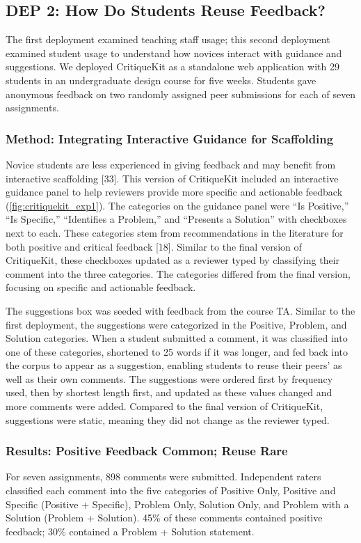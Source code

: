 \subsection{DEP 2: How Do Students Reuse Feedback?}
The first deployment examined teaching staff usage; this second deployment examined student usage to understand how novices interact with guidance and suggestions. We deployed CritiqueKit as a standalone web application with 29 students in an undergraduate design course for five weeks. Students gave anonymous feedback on two randomly assigned peer submissions for each of seven assignments.

\subsubsection{Method: Integrating Interactive Guidance for Scaffolding}
Novice students are less experienced in giving feedback and may benefit from interactive scaffolding [33]. This version of CritiqueKit included an interactive guidance panel to help reviewers provide more specific and actionable feedback (\autoref{fig:critiquekit_exp1}). The categories on the guidance panel were ``Is Positive,'' ``Is Specific,'' ``Identifies a Problem,'' and ``Presents a Solution'' with checkboxes next to each. These categories stem from recommendations in the literature for both positive and critical feedback [18]. Similar to the final version of CritiqueKit, these checkboxes updated as a reviewer typed by classifying their comment into the three categories. The categories differed from the final version, focusing on specific and actionable feedback. 

The suggestions box was seeded with feedback from the course TA. Similar to the first deployment, the suggestions were categorized in the Positive, Problem, and Solution categories. When a student submitted a comment, it was classified into one of these categories, shortened to 25 words if it was longer, and fed back into the corpus to appear as a suggestion, enabling students to reuse their peers' as well as their own comments. The suggestions were ordered first by frequency used, then by shortest length first, and updated as these values changed and more comments were added. Compared to the final version of CritiqueKit, suggestions were static, meaning they did not change as the reviewer typed.

\subsubsection{Results: Positive Feedback Common; Reuse Rare}
For seven assignments, 898 comments were submitted. Independent raters classified each comment into the five categories of Positive Only, Positive  and  Specific (Positive + Specific), Problem Only, Solution Only, and Problem with a Solution (Problem + Solution). 45\% of these comments contained positive feedback; 30\% contained a Problem + Solution statement. 

